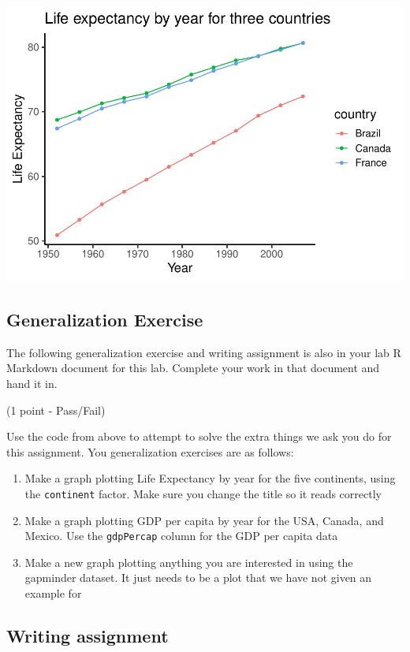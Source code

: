 \documentclass[
]{book}
\begin{document}
\includegraphics{Statistics_Lab_files/figure-latex/1scatline-1.pdf}

\hypertarget{generalization-exercise}{%
\subsection{Generalization Exercise}\label{generalization-exercise}}

The following generalization exercise and writing assignment is also in your lab R Markdown document for this lab. Complete your work in that document and hand it in.

(1 point - Pass/Fail)

Use the code from above to attempt to solve the extra things we ask you do for this assignment. You generalization exercises are as follows:

\begin{enumerate}
\def\labelenumi{\arabic{enumi}.}
\item
  Make a graph plotting Life Expectancy by year for the five continents, using the \texttt{continent} factor. Make sure you change the title so it reads correctly
\item
  Make a graph plotting GDP per capita by year for the USA, Canada, and Mexico. Use the \texttt{gdpPercap} column for the GDP per capita data
\item
  Make a new graph plotting anything you are interested in using the gapminder dataset. It just needs to be a plot that we have not given an example for
\end{enumerate}

\hypertarget{writing-assignment}{%
\subsection{Writing assignment}\label{writing-assignment}}
\end{document}
